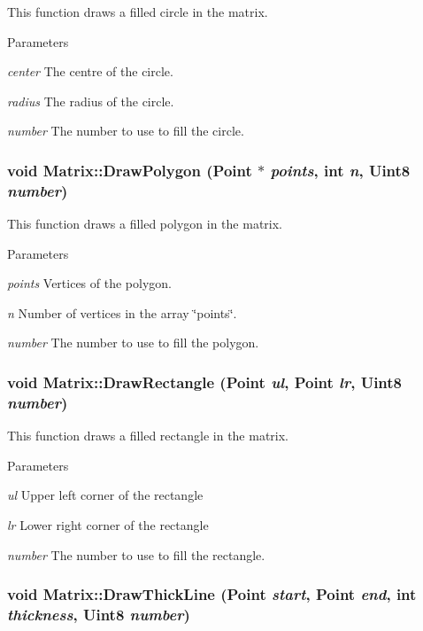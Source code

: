 This function draws a filled circle in the matrix. 


\begin{DoxyParams}{Parameters}
\item[{\em center}]The centre of the circle. \item[{\em radius}]The radius of the circle. \item[{\em number}]The number to use to fill the circle. \end{DoxyParams}
\hypertarget{classMatrix_a3b2f9c59a4cc8da933de12f4ccb867f6}{
\subsubsection[{DrawPolygon}]{\setlength{\rightskip}{0pt plus 5cm}void Matrix::DrawPolygon ({\bf Point} $\ast$ {\em points}, \/  int {\em n}, \/  Uint8 {\em number})}}
\label{classMatrix_a3b2f9c59a4cc8da933de12f4ccb867f6}


This function draws a filled polygon in the matrix. 


\begin{DoxyParams}{Parameters}
\item[{\em points}]Vertices of the polygon. \item[{\em n}]Number of vertices in the array \char`\"{}points\char`\"{}. \item[{\em number}]The number to use to fill the polygon. \end{DoxyParams}
\hypertarget{classMatrix_a55977ba3ee91f352759f446a5092ea23}{
\subsubsection[{DrawRectangle}]{\setlength{\rightskip}{0pt plus 5cm}void Matrix::DrawRectangle ({\bf Point} {\em ul}, \/  {\bf Point} {\em lr}, \/  Uint8 {\em number})}}
\label{classMatrix_a55977ba3ee91f352759f446a5092ea23}


This function draws a filled rectangle in the matrix. 


\begin{DoxyParams}{Parameters}
\item[{\em ul}]Upper left corner of the rectangle \item[{\em lr}]Lower right corner of the rectangle \item[{\em number}]The number to use to fill the rectangle. \end{DoxyParams}
\hypertarget{classMatrix_a8aecf2d42e65b27f051c8af79aeeb467}{
\subsubsection[{DrawThickLine}]{\setlength{\rightskip}{0pt plus 5cm}void Matrix::DrawThickLine ({\bf Point} {\em start}, \/  {\bf Point} {\em end}, \/  int {\em thickness}, \/  Uint8 {\em number})}}
\label{classMatrix_a8aecf2d42e65b27f051c8af79aeeb467}


